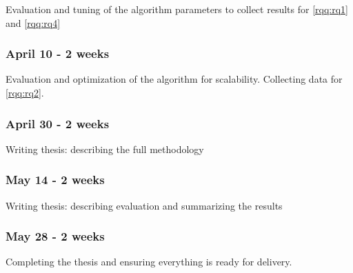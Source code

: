 \documentclass[
acmsmall,
nonacm,
screen,
acmthm]{../../scripts/pandoc/templates/acmart}
\begin{document}
Evaluation and tuning of the algorithm parameters to collect results for
\cref{rqq:rq1} and \cref{rqq:rq4}

\hypertarget{april-10---2-weeks}{%
\subsubsection{April 10 - 2 weeks}\label{april-10---2-weeks}}

Evaluation and optimization of the algorithm for scalability. Collecting
data for \cref{rqq:rq2}.

\hypertarget{april-30---2-weeks}{%
\subsubsection{April 30 - 2 weeks}\label{april-30---2-weeks}}

Writing thesis: describing the full methodology

\hypertarget{may-14---2-weeks}{%
\subsubsection{May 14 - 2 weeks}\label{may-14---2-weeks}}

Writing thesis: describing evaluation and summarizing the results

\hypertarget{may-28---2-weeks}{%
\subsubsection{May 28 - 2 weeks}\label{may-28---2-weeks}}

Completing the thesis and ensuring everything is ready for delivery.


\end{document}
